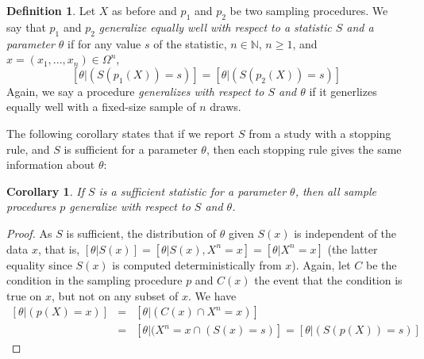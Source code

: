 \documentclass[man]{apa7}\usepackage[]{graphicx}\usepackage[]{xcolor}
\newtheorem{cor}[thm]{Corollary}
\theoremstyle{definition}
\newtheorem{defn}[thm]{Definition}
\newcommand{\N} {\mathbb{N}}
\begin{document}
\begin{defn}
\label{defn:sufficient}
Let $X$ as before and $p_1$ and $p_2$ be two sampling procedures. We say that $p_1$ and $p_2$ \emph{generalize equally well with respect to a statistic $S$ and a parameter $\theta$} if for any value $s$ of the statistic, $n \in \N$, $n \geq 1$, and $x = (x_1,...,x_n) \in \Omega^n$,
\begin{equation} \left[\theta|(S(p_1(X)) = s)\right] = \left[\theta|(S(p_2(X)) = s)\right] \end{equation}
Again, we say a procedure \emph{generalizes with respect to $S$ and $\theta$} if it generlizes equally well with a fixed-size sample of $n$ draws.
\end{defn}

The following corollary states that if we report $S$ from a study with a stopping rule, and $S$ is sufficient for a parameter $\theta$, then each stopping rule gives the same information about $\theta$:

\begin{cor} \label{cor:GenalizeWRTSufficient}
If $S$ is a sufficient statistic for a parameter $\theta$, then all sample procedures $p$ generalize with respect to $S$ and $\theta$.
\end{cor}
\begin{proof}
As $S$ is sufficient, the distribution of $\theta$ given $S(x)$ is independent of the data $x$, that is, $\left[\theta|S(x)\right] = \left[\theta|S(x),X^n = x\right] = \left[\theta|X^n = x\right]$ (the latter equality since $S(x)$ is computed deterministically from $x$). Again, let $C$ be the condition in the sampling procedure $p$ and $C(x)$ the event that the condition is true on $x$, but not on any subset of $x$. We have
\begin{eqnarray}
\left[\theta|(p(X) = x) \right] &=& \left[\theta|(C(x) \cap X^n = x)\right] \\
&=& \left[\theta|(X^n = x \cap (S(x) = s)\right] = \left[\theta | (S(p(X)) = s)\right] 
\end{eqnarray}
\end{proof}
\end{document}

